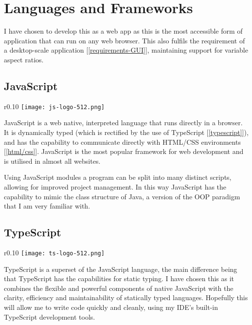 \section{Languages and Frameworks}

    I have chosen to develop this as a web app as this is the most accessible form of application that can run on any web browser. This also fulfils the requirement of a desktop-scale application [\autoref{requirements-GUI}], maintaining support for variable aspect ratios.

    \subsection{JavaScript}

        \begin{wrapfigure}{r}{0.10\textwidth}
            \centering
            \texttt{[image: js-logo-512.png]}
        \end{wrapfigure}

        JavaScript is a web native, interpreted language that runs directly in a browser. It is dynamically typed (which is rectified by the use of TypeScript [\autoref{typescript}]), and has the capability to communicate directly with HTML/CSS environments [\autoref{html/css}]. JavaScript is the most popular framework for web development and is utilised in almost all websites.

        Using JavaScript modules a program can be split into many distinct scripts, allowing for improved project management. In this way JavaScript has the capability to mimic the class structure of Java, a version of the OOP paradigm that I am very familiar with.


    \subsection{TypeScript}
    \label{typescript}

        \begin{wrapfigure}{r}{0.10\textwidth}
            \centering
            \texttt{[image: ts-logo-512.png]}
        \end{wrapfigure}

        TypeScript \cite{typescript} is a superset of the JavaScript language, the main difference being that TypeScript has the capabilities for static typing. I have chosen this as it combines the flexible and powerful components of native JavaScript with the clarity, efficiency and maintainability of statically typed languages. Hopefully this will allow me to write code quickly and cleanly, using my IDE's built-in TypeScript development tools.

